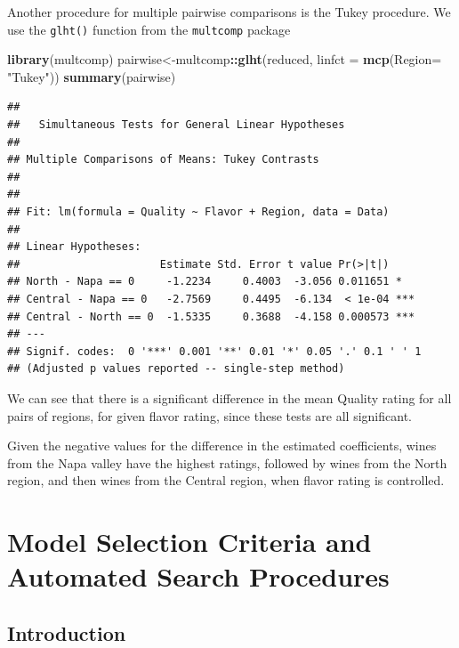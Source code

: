 \documentclass[
]{book}
\newenvironment{Shaded}{\begin{snugshade}}{\end{snugshade}}
\newcommand{\AttributeTok}[1]{\textcolor[rgb]{0.13,0.29,0.53}{#1}}
\newcommand{\FunctionTok}[1]{\textcolor[rgb]{0.13,0.29,0.53}{\textbf{#1}}}
\newcommand{\NormalTok}[1]{#1}
\newcommand{\OtherTok}[1]{\textcolor[rgb]{0.56,0.35,0.01}{#1}}
\newcommand{\SpecialCharTok}[1]{\textcolor[rgb]{0.81,0.36,0.00}{\textbf{#1}}}
\newcommand{\StringTok}[1]{\textcolor[rgb]{0.31,0.60,0.02}{#1}}
\begin{document}
Another procedure for multiple pairwise comparisons is the Tukey procedure. We use the \texttt{glht()} function from the \texttt{multcomp} package

\begin{Shaded}
\begin{Highlighting}[]
\FunctionTok{library}\NormalTok{(multcomp)}
\NormalTok{pairwise}\OtherTok{\textless{}{-}}\NormalTok{multcomp}\SpecialCharTok{::}\FunctionTok{glht}\NormalTok{(reduced, }\AttributeTok{linfct =} \FunctionTok{mcp}\NormalTok{(}\AttributeTok{Region=} \StringTok{"Tukey"}\NormalTok{))}
\FunctionTok{summary}\NormalTok{(pairwise)}
\end{Highlighting}
\end{Shaded}

\begin{verbatim}
## 
##   Simultaneous Tests for General Linear Hypotheses
## 
## Multiple Comparisons of Means: Tukey Contrasts
## 
## 
## Fit: lm(formula = Quality ~ Flavor + Region, data = Data)
## 
## Linear Hypotheses:
##                      Estimate Std. Error t value Pr(>|t|)    
## North - Napa == 0     -1.2234     0.4003  -3.056 0.011651 *  
## Central - Napa == 0   -2.7569     0.4495  -6.134  < 1e-04 ***
## Central - North == 0  -1.5335     0.3688  -4.158 0.000573 ***
## ---
## Signif. codes:  0 '***' 0.001 '**' 0.01 '*' 0.05 '.' 0.1 ' ' 1
## (Adjusted p values reported -- single-step method)
\end{verbatim}

We can see that there is a significant difference in the mean Quality rating for all pairs of regions, for given flavor rating, since these tests are all significant.

Given the negative values for the difference in the estimated coefficients, wines from the Napa valley have the highest ratings, followed by wines from the North region, and then wines from the Central region, when flavor rating is controlled.

\hypertarget{crit}{%
\chapter{Model Selection Criteria and Automated Search Procedures}\label{crit}}

\hypertarget{introduction-8}{%
\section{Introduction}\label{introduction-8}}
\end{document}
